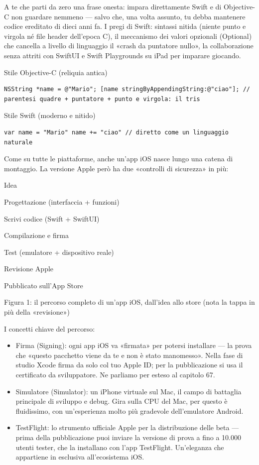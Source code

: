 A te che parti da zero una frase onesta: impara direttamente Swift e di Objective-C non guardare nemmeno — salvo che, una volta assunto, tu debba mantenere codice ereditato di dieci anni fa. I pregi di Swift: sintassi nitida (niente punto e virgola né file header dell'epoca C), il meccanismo dei valori opzionali (Optional) che cancella a livello di linguaggio il «crash da puntatore nullo», la collaborazione senza attriti con SwiftUI e Swift Playgrounds su iPad per imparare giocando.

Stile Objective-C (reliquia antica)

\begin{lstlisting}
NSString *name = @"Mario"; [name stringByAppendingString:@"ciao"]; // parentesi quadre + puntatore + punto e virgola: il tris
\end{lstlisting}

Stile Swift (moderno e nitido)

\begin{lstlisting}
var name = "Mario" name += "ciao" // diretto come un linguaggio naturale
\end{lstlisting}


Come su tutte le piattaforme, anche un'app iOS nasce lungo una catena di montaggio. La versione Apple però ha due «controlli di sicurezza» in più:

Idea

Progettazione (interfaccia + funzioni)

Scrivi codice (Swift + SwiftUI)

Compilazione e firma

Test (emulatore + dispositivo reale)

Revisione Apple

Pubblicato sull'App Store

\begin{center}\small\color{gray}Figura 1: il percorso completo di un'app iOS, dall'idea allo store (nota la tappa in più della «revisione»)\end{center}

I concetti chiave del percorso:

\begin{itemize}
  \item Firma (Signing): ogni app iOS va «firmata» per potersi installare — la prova che «questo pacchetto viene da te e non è stato manomesso». Nella fase di studio Xcode firma da solo col tuo Apple ID; per la pubblicazione si usa il certificato da sviluppatore. Ne parliamo per esteso al capitolo 67.
  \item Simulatore (Simulator): un iPhone virtuale sul Mac, il campo di battaglia principale di sviluppo e debug. Gira sulla CPU del Mac, per questo è fluidissimo, con un'esperienza molto più gradevole dell'emulatore Android.
  \item TestFlight: lo strumento ufficiale Apple per la distribuzione delle beta — prima della pubblicazione puoi inviare la versione di prova a fino a 10.000 utenti tester, che la installano con l'app TestFlight. Un'eleganza che appartiene in esclusiva all'ecosistema iOS.
\end{itemize}

